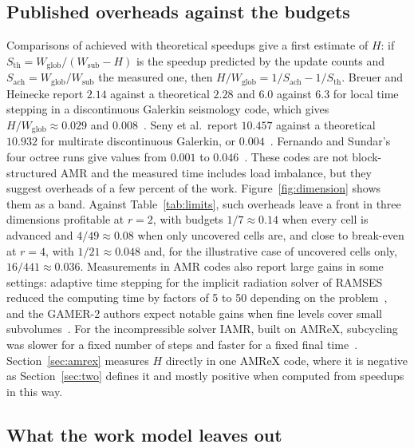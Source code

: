 \documentclass[12pt]{article}
\theoremstyle{remark}
\newcommand{\WG}{W_{\mathrm{glob}}}
\newcommand{\WL}{W_{\mathrm{sub}}}
\begin{document}
\subsection{Published overheads against the budgets}\label{sec:published}

Comparisons of achieved with theoretical speedups give a first estimate of $H$: if $S_{\mathrm{th}}=\WG/(\WL-H)$ is the speedup predicted by the update counts and $S_{\mathrm{ach}}=\WG/\WL$ the measured one, then $H/\WG=1/S_{\mathrm{ach}}-1/S_{\mathrm{th}}$. Breuer and Heinecke report $2.14$ against a theoretical $2.28$ and $6.0$ against $6.3$ for local time stepping in a discontinuous Galerkin seismology code, which gives $H/\WG\approx0.029$ and $0.008$~\cite{breuer2022next}. Seny et al.\ report $10.457$ against a theoretical $10.932$ for multirate discontinuous Galerkin, or $0.004$~\cite{seny2014efficient}. Fernando and Sundar's four octree runs give values from $0.001$ to $0.046$~\cite{fernando2022scalable}. These codes are not block-structured AMR and the measured time includes load imbalance, but they suggest overheads of a few percent of the work. Figure~\ref{fig:dimension} shows them as a band. Against Table~\ref{tab:limits}, such overheads leave a front in three dimensions profitable at $r=2$, with budgets $1/7\approx0.14$ when every cell is advanced and $4/49\approx0.08$ when only uncovered cells are, and close to break-even at $r=4$, with $1/21\approx0.048$ and, for the illustrative case of uncovered cells only, $16/441\approx0.036$. Measurements in AMR codes also report large gains in some settings: adaptive time stepping for the implicit radiation solver of RAMSES reduced the computing time by factors of 5 to 50 depending on the problem~\cite{commercon2014fast}, and the GAMER-2 authors expect notable gains when fine levels cover small subvolumes~\cite{schive2018gamer}. For the incompressible solver IAMR, built on AMReX, subcycling was slower for a fixed number of steps and faster for a fixed final time~\cite{liu2024investigate}. Section~\ref{sec:amrex} measures $H$ directly in one AMReX code, where it is negative as Section~\ref{sec:two} defines it and mostly positive when computed from speedups in this way.

\subsection{What the work model leaves out}\label{sec:limits}
\end{document}
